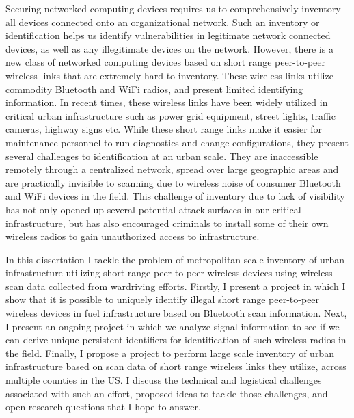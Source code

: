 \begin{dissertationabstract}
    Securing networked computing devices requires us to comprehensively inventory all devices connected onto an organizational network. Such an inventory or identification helps us identify vulnerabilities in legitimate network connected devices, as well as any illegitimate devices on the network. However, there is a new class of networked computing devices based on short range peer-to-peer wireless links  that are extremely hard to inventory. These wireless links utilize commodity Bluetooth and WiFi radios, and present limited identifying information. In recent times, these wireless links have been widely utilized in critical urban infrastructure such as power grid equipment, street lights, traffic cameras, highway signs etc. While these short range links make it easier for maintenance personnel to run diagnostics and change configurations, they present several challenges to identification at an urban scale. They are inaccessible remotely through a centralized network, spread over large geographic areas and are practically invisible to scanning due to wireless noise of consumer Bluetooth and WiFi devices in the field. This challenge of inventory due to lack of visibility has not only opened up several potential attack surfaces in our critical infrastructure, but has also encouraged criminals to install some of their own wireless radios to gain unauthorized access to infrastructure.

    In this dissertation I tackle the problem of metropolitan scale inventory of urban infrastructure utilizing short range peer-to-peer wireless devices using wireless scan data collected from wardriving efforts. Firstly, I present a project in which I show that it is possible to uniquely identify illegal short range peer-to-peer wireless devices in fuel infrastructure based on Bluetooth scan information. Next, I present an ongoing project in which we analyze signal information to see if we can derive unique persistent identifiers for identification of such wireless radios in the field. Finally, I propose a project to perform large scale inventory of urban infrastructure based on scan data of short range wireless links they utilize, across multiple counties in the US. I discuss the technical and logistical challenges associated with such an effort, proposed ideas to tackle those challenges, and open research questions that I hope to answer.
    
\end{dissertationabstract}